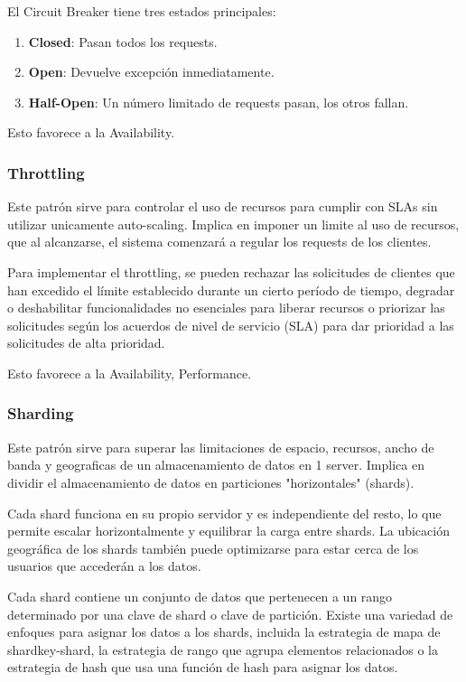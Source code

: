 \documentclass{article}
\begin{document}
		El Circuit Breaker tiene tres estados principales:
			\begin{enumerate}
				\item \textbf{Closed}: Pasan todos los requests.
				
				\item \textbf{Open}: Devuelve excepción inmediatamente.
				\item \textbf{Half-Open}: Un número limitado de	requests pasan, los otros fallan.
			
			\end{enumerate}
		
		Esto favorece a la Availability.
		
		\subsubsection{Throttling}
		Este patrón sirve para controlar el uso de recursos para cumplir con SLAs sin utilizar unicamente auto-scaling. Implica en imponer un limite al uso de recursos, que al alcanzarse, el sistema comenzará a regular los requests de los clientes.
		
		Para implementar el throttling, se pueden rechazar las solicitudes de clientes que han excedido el límite establecido durante un cierto período de tiempo, degradar o deshabilitar funcionalidades no esenciales para liberar recursos o priorizar las solicitudes según los acuerdos de nivel de servicio (SLA) para dar prioridad a las solicitudes de alta prioridad.
		
		Esto favorece a la Availability, Performance.
		
				
		\subsubsection{Sharding}
		Este patrón sirve para superar las limitaciones de espacio, recursos, ancho de banda y geograficas de un almacenamiento de datos en 1 server. Implica en dividir el almacenamiento de datos en particiones "horizontales" (shards).
		
		Cada shard funciona en su propio servidor y es independiente del resto, lo que permite escalar horizontalmente y equilibrar la carga entre shards. La ubicación geográfica de los shards también puede optimizarse para estar cerca de los usuarios que accederán a los datos.
		
		Cada shard contiene un conjunto de datos que pertenecen a un rango determinado por una clave de shard o clave de partición. Existe una variedad de enfoques para asignar los datos a los shards, incluida la estrategia de mapa de shardkey-shard, la estrategia de rango que agrupa elementos relacionados o la estrategia de hash que usa una función de hash para asignar los datos.
		
\end{document}
